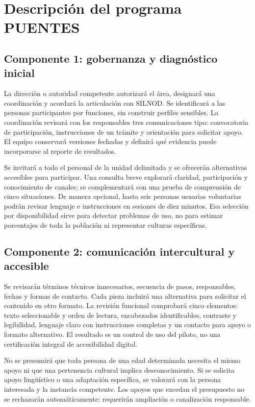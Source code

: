 \documentclass[12pt,letterpaper,oneside]{article}
\begin{document}
\section{Descripción del programa PUENTES}
\subsection{Componente 1: gobernanza y diagnóstico inicial}
La dirección o autoridad competente autorizará el área, designará una coordinación y acordará la articulación con SILNOD. Se identificará a las personas participantes por funciones, sin construir perfiles sensibles. La coordinación revisará con los responsables tres comunicaciones tipo: convocatoria de participación, instrucciones de un trámite y orientación para solicitar apoyo. El equipo conservará versiones fechadas y definirá qué evidencia puede incorporarse al reporte de resultados.

Se invitará a todo el personal de la unidad delimitada y se ofrecerán alternativas accesibles para participar. Una consulta breve explorará claridad, participación y conocimiento de canales; se complementará con una prueba de comprensión de cinco situaciones. De manera opcional, hasta seis personas usuarias voluntarias podrán revisar lenguaje e instrucciones en sesiones de diez minutos. Esa selección por disponibilidad sirve para detectar problemas de uso, no para estimar porcentajes de toda la población ni representar culturas específicas.

\subsection{Componente 2: comunicación intercultural y accesible}
Se revisarán términos técnicos innecesarios, secuencia de pasos, responsables, fechas y formas de contacto. Cada pieza incluirá una alternativa para solicitar el contenido en otro formato. La revisión funcional comprobará cinco elementos: texto seleccionable y orden de lectura, encabezados identificables, contraste y legibilidad, lenguaje claro con instrucciones completas y un contacto para apoyo o formato alternativo. El resultado es un control de uso del piloto, no una certificación integral de accesibilidad digital.

No se presumirá que toda persona de una edad determinada necesita el mismo apoyo ni que una pertenencia cultural implica desconocimiento. Si se solicita apoyo lingüístico o una adaptación específica, se valorará con la persona interesada y la instancia competente. Los apoyos que excedan el presupuesto no se rechazarán automáticamente: requerirán ampliación o canalización responsable.
\end{document}
